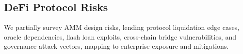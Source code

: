 \subsection{DeFi Protocol Risks}
We partially survey AMM design risks, lending protocol liquidation edge cases, oracle dependencies, flash loan exploits, cross-chain bridge vulnerabilities, and governance attack vectors, mapping to enterprise exposure and mitigations.



